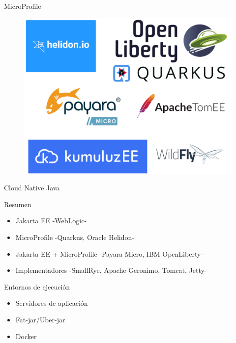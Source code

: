 \documentclass[aspectratio=169]{beamer}
\begin{document}
\begin{frame}{MicroProfile}
\begin{figure}
	\centering
	\includegraphics[width=\linewidth]{Images/microprofileimplementations}
\end{figure}
\end{frame}

\begin{frame}{Cloud Native Java}

Resumen
\begin{itemize}
\item Jakarta EE -WebLogic-
\item MicroProfile -Quarkus, Oracle Helidon-
\item Jakarta EE + MicroProfile -Payara Micro, IBM OpenLiberty-
\item Implementadores -SmallRye, Apache Geronimo, Tomcat, Jetty-
\end{itemize}

Entornos de ejecución
\begin{itemize}
\item Servidores de aplicación
\item Fat-jar/Uber-jar
\item Docker
\end{itemize}
\end{frame}
\end{document}
